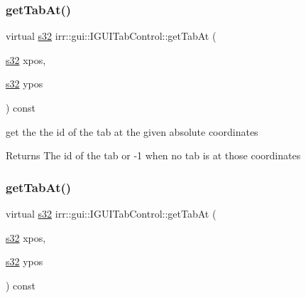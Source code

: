\subsubsection{\texorpdfstring{get\+Tab\+At()}{getTabAt()}\hspace{0.1cm}{\footnotesize\ttfamily [1/2]}}
{\footnotesize\ttfamily virtual \hyperlink{namespaceirr_ac66849b7a6ed16e30ebede579f9b47c6}{s32} irr\+::gui\+::\+I\+G\+U\+I\+Tab\+Control\+::get\+Tab\+At (\begin{DoxyParamCaption}\item[{\hyperlink{namespaceirr_ac66849b7a6ed16e30ebede579f9b47c6}{s32}}]{xpos,  }\item[{\hyperlink{namespaceirr_ac66849b7a6ed16e30ebede579f9b47c6}{s32}}]{ypos }\end{DoxyParamCaption}) const\hspace{0.3cm}{\ttfamily [pure virtual]}}



get the the id of the tab at the given absolute coordinates 

\begin{DoxyReturn}{Returns}
The id of the tab or -\/1 when no tab is at those coordinates 
\end{DoxyReturn}
\mbox{\label{classirr_1_1gui_1_1IGUITabControl_abe529c6da00af1e156357562eafec031}} 
\subsubsection{\texorpdfstring{get\+Tab\+At()}{getTabAt()}\hspace{0.1cm}{\footnotesize\ttfamily [2/2]}}
{\footnotesize\ttfamily virtual \hyperlink{namespaceirr_ac66849b7a6ed16e30ebede579f9b47c6}{s32} irr\+::gui\+::\+I\+G\+U\+I\+Tab\+Control\+::get\+Tab\+At (\begin{DoxyParamCaption}\item[{\hyperlink{namespaceirr_ac66849b7a6ed16e30ebede579f9b47c6}{s32}}]{xpos,  }\item[{\hyperlink{namespaceirr_ac66849b7a6ed16e30ebede579f9b47c6}{s32}}]{ypos }\end{DoxyParamCaption}) const\hspace{0.3cm}{\ttfamily [pure virtual]}}




